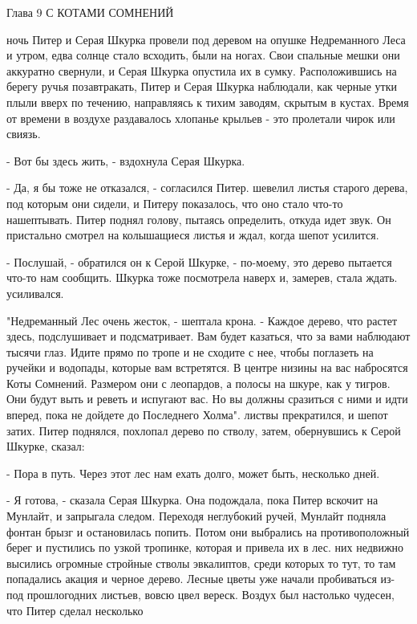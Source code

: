 Глава 9
 С КОТАМИ СОМНЕНИЙ
\par{} ночь Питер и Серая Шкурка провели под деревом на опушке 
Недреманного Леса и утром, едва солнце стало всходить, были на ногах. 
Свои спальные мешки они аккуратно свернули, и Серая Шкурка опустила их 
в сумку. Расположившись на берегу ручья позавтракать, Питер и Серая 
Шкурка наблюдали, как черные утки плыли вверх по течению, направляясь 
к тихим заводям, скрытым в кустах. Время от времени в воздухе 
раздавалось хлопанье крыльев - это пролетали чирок или свиязь.
\par- Вот бы здесь жить, - вздохнула Серая Шкурка.
\par- Да, я бы тоже не отказался, - согласился Питер.
 шевелил листья старого дерева, под которым они сидели, и 
Питеру показалось, что оно стало что-то нашептывать. Питер поднял 
голову, пытаясь определить, откуда идет звук. Он пристально смотрел на 
колышащиеся листья и ждал, когда шепот усилится.
\par- Послушай, - обратился он к Серой Шкурке, - по-моему, это дерево 
пытается что-то нам сообщить.
 Шкурка тоже посмотрела наверх и, замерев, стала ждать.
 усиливался.
\par"Недреманный Лес очень жесток, - шептала крона. - Каждое дерево, 
что растет здесь, подслушивает и подсматривает. Вам будет казаться, 
что за вами наблюдают тысячи глаз. Идите прямо по тропе и не сходите с 
нее, чтобы поглазеть на ручейки и водопады, которые вам встретятся. В 
центре низины на вас набросятся Коты Сомнений. Размером они с 
леопардов, а полосы на шкуре, как у тигров. Они будут выть и реветь и 
испугают вас. Но вы должны сразиться с ними и идти вперед, пока не 
дойдете до Последнего Холма".
 листвы прекратился, и шепот затих. Питер поднялся, похлопал 
дерево по стволу, затем, обернувшись к Серой Шкурке, сказал:
\par- Пора в путь. Через этот лес нам ехать долго, может быть, 
несколько дней.
\par- Я готова, - сказала Серая Шкурка. Она подождала, пока Питер 
вскочит на Мунлайт, и запрыгала следом. Переходя неглубокий ручей, 
Мунлайт подняла фонтан брызг и остановилась попить. Потом они 
выбрались на противоположный берег и пустились по узкой тропинке, 
которая и привела их в лес.
 них недвижно высились огромные стройные стволы эвкалиптов, 
среди которых то тут, то там попадались акация и черное дерево. Лесные 
цветы уже начали пробиваться из-под прошлогодних листьев, вовсю цвел 
вереск. Воздух был настолько чудесен, что Питер сделал несколько 
